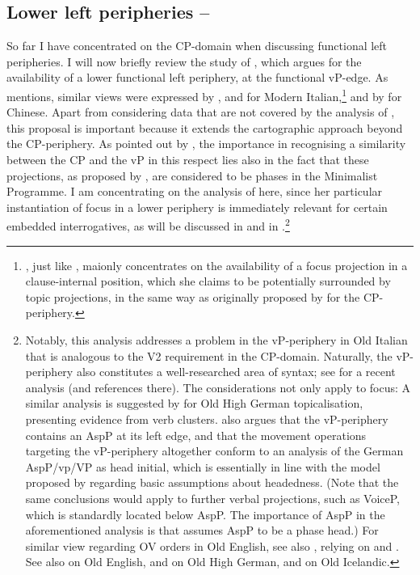 \subsection{Lower left peripheries -- \citet{poletto2006}} \label{sec:2poletto}
So far I have concentrated on the CP-domain when discussing functional left peripheries. I will now briefly review the study of \citet{poletto2006}, which argues for the availability of a lower functional left periphery, at the functional vP-edge. As \citet[261]{poletto2006} mentions, similar views were expressed by \citet{jayaseelan2001}, \citet{bellettishlonsky1995} and \citet{belletti2004} for Modern Italian,\footnote{\citet{belletti2004}, just like \citet{poletto2006}, maionly concentrates on the availability of a focus projection in a clause-internal position, which she claims to be potentially surrounded by topic projections, in the same way as originally proposed by \citet{rizzi1997} for the CP-periphery.} and by \citet{paul2002} for Chinese. Apart from considering data that are not covered by the analysis of \citet{rizzi1997}, this proposal is important because it extends the cartographic approach beyond the CP-periphery. As pointed out by \citet[17--18]{belletti2004}, the importance in recognising a similarity between the CP and the vP in this respect lies also in the fact that these projections, as proposed by \citet{chomsky2001}, are considered to be phases in the Minimalist Programme. I am concentrating on the analysis of \citet{poletto2006} here, since her particular instantiation of focus in a lower periphery is immediately relevant for certain embedded interrogatives, as will be discussed in  and in .\footnote{Notably, this analysis addresses a problem in the vP-periphery in Old Italian that is analogous to the V2 requirement in the CP-domain. Naturally, the vP-periphery also constitutes a well-researched area of syntax; see \citet{bonan2021} for a recent analysis (and references there). The considerations not only apply to focus: A similar analysis is suggested by \citet{hinterhoelzl2006} for Old High German topicalisation, presenting evidence from verb clusters. \citet{hinterhoelzl2018} also argues that the vP-periphery contains an AspP at its left edge, and that the movement operations targeting the vP-periphery altogether conform to an analysis of the German AspP/vp/VP as head initial, which is essentially in line with the model proposed by \citealt{kayne1994} regarding basic assumptions about headedness. (Note that the same conclusions would apply to further verbal projections, such as VoiceP, which is standardly located below AspP. The importance of AspP in the aforementioned analysis is that \citealt[249]{hinterhoelzl2006} assumes AspP to be a phase head.) For similar view regarding OV orders in Old English, see also \citet{struikvankemenade2022}, relying on \citet{struikvankemenade2020} and \citet{biberauerroberts2005}. See also \citet{roberts1997} on Old English, \citet{hinterhoelzl2004, hinterhoelzl2009, hinterhoelzl2010, hinterhoelzl2015} and \citet{hinterhoelzlpetrova2010focus} on Old High German, and \citet{hroarsdottir2000} on Old Icelandic.}

